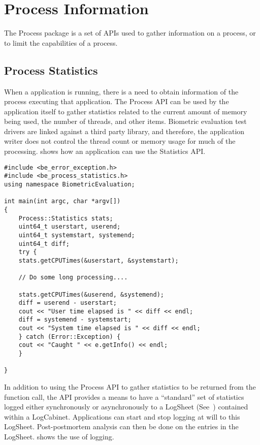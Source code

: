 %
%
\chapter{Process Information}
\label{chp-process}

The Process package is a set of APIs used to gather information on a process,
or to limit the capabilities of a process.

\section{Process Statistics}
\label{sec-process_statistics}

When a application is running, there is a need to obtain information of the
process executing that application. The Process API can be used by the
application itself to gather statistics related to the current amount of memory
being used, the number of threads, and other items. Biometric evaluation test
drivers are linked against a third party library, and therefore, the application
writer does not control the thread count or memory usage for much of the
processing.  shows how an application can
use the Statistics API.

\begin{lstlisting}[caption={Gathering Process Statistics}, label=processstatisticsuse]
#include <be_error_exception.h>
#include <be_process_statistics.h>
using namespace BiometricEvaluation;

int main(int argc, char *argv[])
{
    Process::Statistics stats;
    uint64_t userstart, userend;
    uint64_t systemstart, systemend;
    uint64_t diff;
    try {
	stats.getCPUTimes(&userstart, &systemstart);

	// Do some long processing....

	stats.getCPUTimes(&userend, &systemend);
	diff = userend - userstart;
	cout << "User time elapsed is " << diff << endl;
	diff = systemend - systemstart;
	cout << "System time elapsed is " << diff << endl;
    } catch (Error::Exception) {
	cout << "Caught " << e.getInfo() << endl;
    }

}
\end{lstlisting}

In addition to using the Process API to gather statistics to be returned from
the function call, the API provides a means to have a ``standard'' set of
statistics logged either synchronously or asynchronously to a 
LogSheet (See~) contained within a LogCabinet.
Applications can
start and stop logging at will to this LogSheet. Post-postmortem analysis can
then be done on the entries in the LogSheet. 
shows the use of logging.

